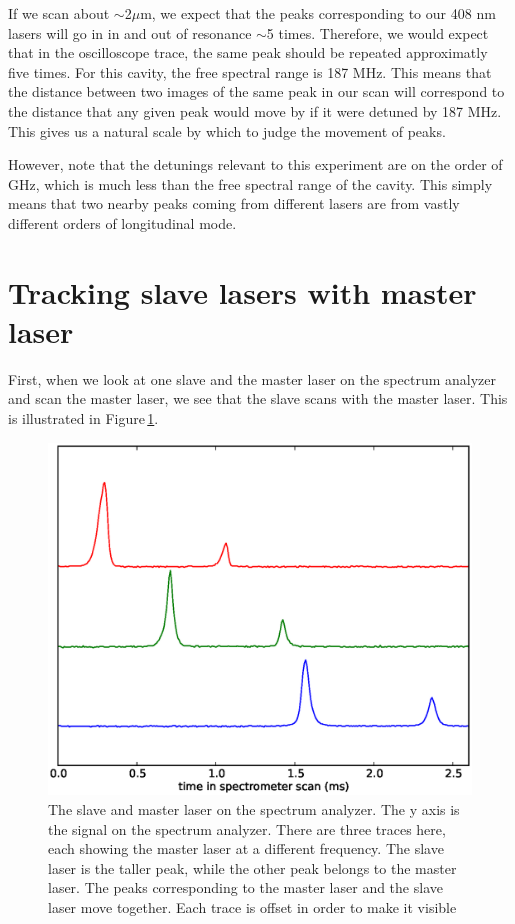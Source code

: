 If we scan about $\sim$2$\mu$m, we expect that the peaks corresponding to our 408 nm lasers will go in in and out of resonance $\sim$5 times. Therefore, we would expect that in the oscilloscope trace, the same peak should be repeated approximatly five times. For this cavity, the free spectral range is 187 MHz. This means that the distance between two images of the same peak in our scan will correspond to the distance that any given peak would move by if it were detuned by 187 MHz. This gives us a natural scale by which to judge the movement of peaks. 

However, note that the detunings relevant to this experiment are on the order of GHz, which is much less than the free spectral range of the cavity. This simply means that two nearby peaks coming from different lasers are from vastly different orders of longitudinal mode. 


\section{Tracking slave lasers with master laser}

First, when we look at one slave and the master laser on the spectrum analyzer and scan the master laser, we see that the slave scans with the master laser. This is illustrated in Figure\,\ref{fig:slaveMaster}.

\begin{figure}
    \centerline{\includegraphics{Slave2AndMasterScanningMaster}}
    \caption[]{\label{fig:slaveMaster}
    The slave and master laser on the spectrum analyzer. The y axis is the signal on the spectrum analyzer. There are three traces here, each showing the master laser at a different frequency. The slave laser is the taller peak, while the other peak belongs to the master laser. The peaks corresponding to the master laser and the slave laser move together. Each trace is offset in order to make it visible}
\end{figure}

